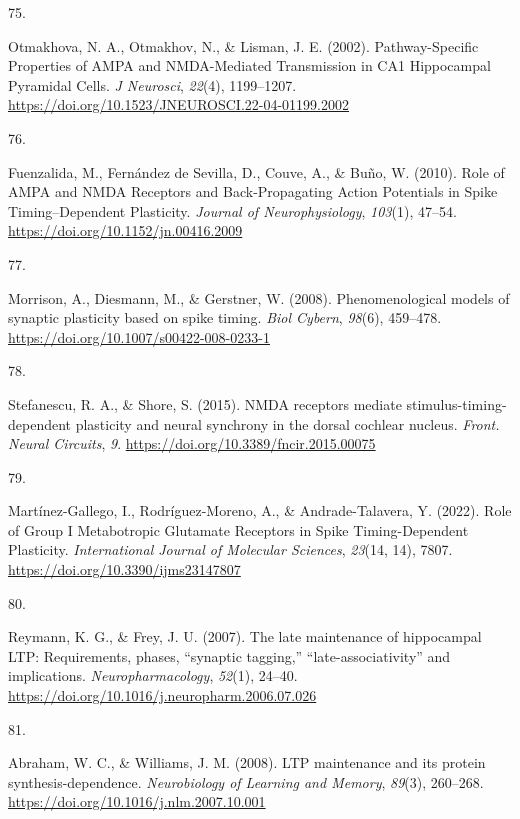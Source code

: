 \documentclass[
  11pt,
  letterpaper,
]{scrreprt}
\newlength{\cslhangindent}
\newlength{\csllabelwidth}
\newenvironment{CSLReferences}[2] %
 {\begin{list}{}{%
  \setlength{\itemindent}{0pt}
  \setlength{\leftmargin}{0pt}
  \setlength{\parsep}{0pt}
  \ifodd #1
   \setlength{\leftmargin}{\cslhangindent}
   \setlength{\itemindent}{-1\cslhangindent}
  \fi
  \setlength{\itemsep}{#2\baselineskip}}}
 {\end{list}}
\newcommand{\CSLLeftMargin}[1]{\parbox[t]{\csllabelwidth}{\strut#1\strut}}
\newcommand{\CSLRightInline}[1]{\parbox[t]{\linewidth - \csllabelwidth}{\strut#1\strut}}
\begin{document}
\begin{CSLReferences}{0}{0}
\CSLLeftMargin{75. }%
\CSLRightInline{Otmakhova, N. A., Otmakhov, N., \& Lisman, J. E. (2002).
Pathway-{Specific Properties} of {AMPA} and {NMDA-Mediated Transmission}
in {CA1 Hippocampal Pyramidal Cells}. \emph{J Neurosci}, \emph{22}(4),
1199--1207. \url{https://doi.org/10.1523/JNEUROSCI.22-04-01199.2002}}

\CSLLeftMargin{76. }%
\CSLRightInline{Fuenzalida, M., Fernández de Sevilla, D., Couve, A., \&
Buño, W. (2010). Role of {AMPA} and {NMDA Receptors} and
{Back-Propagating Action Potentials} in {Spike Timing}--{Dependent
Plasticity}. \emph{Journal of Neurophysiology}, \emph{103}(1), 47--54.
\url{https://doi.org/10.1152/jn.00416.2009}}

\CSLLeftMargin{77. }%
\CSLRightInline{Morrison, A., Diesmann, M., \& Gerstner, W. (2008).
Phenomenological models of synaptic plasticity based on spike timing.
\emph{Biol Cybern}, \emph{98}(6), 459--478.
\url{https://doi.org/10.1007/s00422-008-0233-1}}

\CSLLeftMargin{78. }%
\CSLRightInline{Stefanescu, R. A., \& Shore, S. (2015). {NMDA} receptors
mediate stimulus-timing-dependent plasticity and neural synchrony in the
dorsal cochlear nucleus. \emph{Front. Neural Circuits}, \emph{9}.
\url{https://doi.org/10.3389/fncir.2015.00075}}

\CSLLeftMargin{79. }%
\CSLRightInline{Martínez-Gallego, I., Rodríguez-Moreno, A., \&
Andrade-Talavera, Y. (2022). Role of {Group I Metabotropic Glutamate
Receptors} in {Spike Timing-Dependent Plasticity}. \emph{International
Journal of Molecular Sciences}, \emph{23}(14, 14), 7807.
\url{https://doi.org/10.3390/ijms23147807}}

\CSLLeftMargin{80. }%
\CSLRightInline{Reymann, K. G., \& Frey, J. U. (2007). The late
maintenance of hippocampal {LTP}: {Requirements}, phases, {``synaptic
tagging,''} {``late-associativity''} and implications.
\emph{Neuropharmacology}, \emph{52}(1), 24--40.
\url{https://doi.org/10.1016/j.neuropharm.2006.07.026}}

\CSLLeftMargin{81. }%
\CSLRightInline{Abraham, W. C., \& Williams, J. M. (2008). {LTP}
maintenance and its protein synthesis-dependence. \emph{Neurobiology of
Learning and Memory}, \emph{89}(3), 260--268.
\url{https://doi.org/10.1016/j.nlm.2007.10.001}}


\end{CSLReferences}
\end{document}
